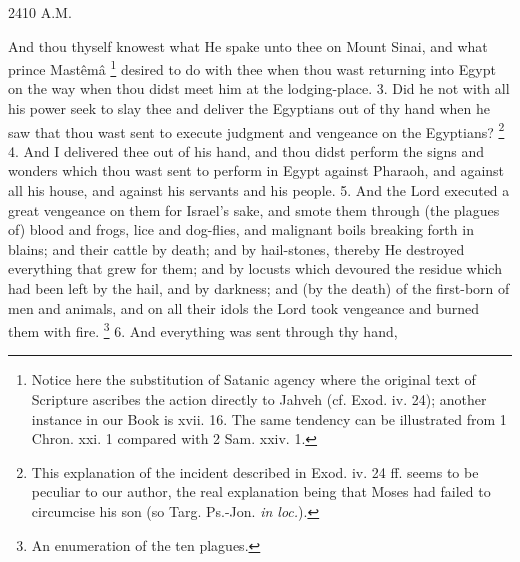 2410 A.M.

And thou thyself knowest what He spake unto thee on Mount Sinai, and what prince Mastêmâ \footnote{Notice here the substitution of Satanic agency where the original text of Scripture ascribes the action directly to Jahveh (cf. Exod. iv. 24); another instance in our Book is xvii. 16. The same tendency can be illustrated from 1 Chron. xxi. 1 compared with 2 Sam. xxiv. 1.} desired to do with thee when thou wast returning into Egypt on the way when thou didst meet him at the lodging-place. 3. Did he not with all his power seek to slay thee and deliver the Egyptians out of thy hand when he saw that thou wast sent to execute judgment and vengeance on the Egyptians? \footnote{This explanation of the incident described in Exod. iv. 24 ff. seems to be peculiar to our author, the real explanation being that Moses had failed to circumcise his son (so Targ. Ps.-Jon. \emph{in loc.}).} 4. And I delivered thee out of his hand, and thou didst perform the signs and wonders which thou wast sent to perform in Egypt against Pharaoh, and against all his house, and against his servants and his people. 5. And the Lord executed a great vengeance on them for Israel's sake, and smote them through (the plagues of) blood and frogs, lice and dog-flies, and malignant boils breaking forth in blains; and their cattle by death; and by hail-stones, thereby He destroyed everything that grew for them; and by locusts which devoured the residue which had been left by the hail, and by darkness; and (by the death) of the first-born of men and animals, and on all their idols the Lord took vengeance and burned them with fire. \footnote{An enumeration of the ten plagues.} 6. And everything was sent through thy hand,

